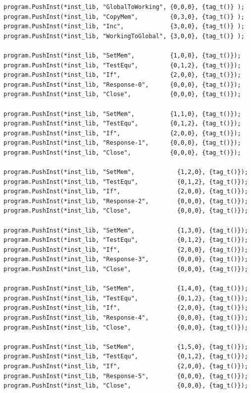 \documentclass[]{book}
\begin{document}
\begin{verbatim}
program.PushInst(*inst_lib, "GlobalToWorking", {0,0,0}, {tag_t()} );
program.PushInst(*inst_lib, "CopyMem",         {0,3,0}, {tag_t()} );
program.PushInst(*inst_lib, "Inc",             {3,0,0}, {tag_t()} );
program.PushInst(*inst_lib, "WorkingToGlobal", {3,0,0}, {tag_t()} );

program.PushInst(*inst_lib, "SetMem",          {1,0,0}, {tag_t()});
program.PushInst(*inst_lib, "TestEqu",         {0,1,2}, {tag_t()});
program.PushInst(*inst_lib, "If",              {2,0,0}, {tag_t()});
program.PushInst(*inst_lib, "Response-0",      {0,0,0}, {tag_t()});
program.PushInst(*inst_lib, "Close",           {0,0,0}, {tag_t()});

program.PushInst(*inst_lib, "SetMem",          {1,1,0}, {tag_t()});
program.PushInst(*inst_lib, "TestEqu",         {0,1,2}, {tag_t()});
program.PushInst(*inst_lib, "If",              {2,0,0}, {tag_t()});
program.PushInst(*inst_lib, "Response-1",      {0,0,0}, {tag_t()});
program.PushInst(*inst_lib, "Close",           {0,0,0}, {tag_t()});

program.PushInst(*inst_lib, "SetMem",            {1,2,0}, {tag_t()});
program.PushInst(*inst_lib, "TestEqu",           {0,1,2}, {tag_t()});
program.PushInst(*inst_lib, "If",                {2,0,0}, {tag_t()});
program.PushInst(*inst_lib, "Response-2",        {0,0,0}, {tag_t()});
program.PushInst(*inst_lib, "Close",             {0,0,0}, {tag_t()});

program.PushInst(*inst_lib, "SetMem",            {1,3,0}, {tag_t()});
program.PushInst(*inst_lib, "TestEqu",           {0,1,2}, {tag_t()});
program.PushInst(*inst_lib, "If",                {2,0,0}, {tag_t()});
program.PushInst(*inst_lib, "Response-3",        {0,0,0}, {tag_t()});
program.PushInst(*inst_lib, "Close",             {0,0,0}, {tag_t()});

program.PushInst(*inst_lib, "SetMem",            {1,4,0}, {tag_t()});
program.PushInst(*inst_lib, "TestEqu",           {0,1,2}, {tag_t()});
program.PushInst(*inst_lib, "If",                {2,0,0}, {tag_t()});
program.PushInst(*inst_lib, "Response-4",        {0,0,0}, {tag_t()});
program.PushInst(*inst_lib, "Close",             {0,0,0}, {tag_t()});

program.PushInst(*inst_lib, "SetMem",            {1,5,0}, {tag_t()});
program.PushInst(*inst_lib, "TestEqu",           {0,1,2}, {tag_t()});
program.PushInst(*inst_lib, "If",                {2,0,0}, {tag_t()});
program.PushInst(*inst_lib, "Response-5",        {0,0,0}, {tag_t()});
program.PushInst(*inst_lib, "Close",             {0,0,0}, {tag_t()});


\end{verbatim}
\end{document}
